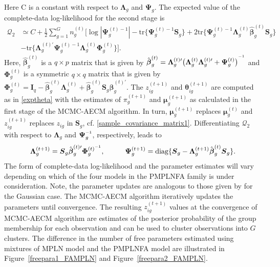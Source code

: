\documentclass[12pt]{article}
\newcommand{\vecI}{\mathbf{I}}
\newcommand{\inv}{^{\raisebox{.2ex}{$\scriptscriptstyle-1$}}}
\begin{document}
Here C is a constant with respect to $\mathbf{\Lambda}_g$ and $\mathbf{\Psi}_g$. The expected value of the complete-data log-likelihood for the second stage is
\begin{equation}
\label{Q2_nonreduced}
\begin{split}
\mathcal{Q}_2 & \simeq C + \frac{1}{2} \sum_{g=1}^G n_g^{(t)} \Bigg[ \log |\boldsymbol{\Psi}_g^{(t) -1}| - \text{tr} \big\{\boldsymbol{\Psi}_g^{(t) -1} \boldsymbol{S}_g\big\} + 2 \text{tr} \big\{\boldsymbol{\Psi}_g^{(t) -1} \boldsymbol{\Lambda}_g^{(t)} \hat{\boldsymbol{\beta}}_g^{(t)} \boldsymbol{S}_g \big\} \\
& - \text{tr}\big\{\boldsymbol{\Lambda}_g^{(t) \prime} \boldsymbol{\Psi}_g^{(t) -1} \boldsymbol{\Lambda}_g^{(t)} \boldsymbol{\Phi}_g^{(t)} \big\} \Bigg].
\end{split}
\end{equation}
Here, $\hat{\boldsymbol{\beta}}_g^{(t)}$ is a $q \times p$ matrix that is given by $\hat{\boldsymbol{\beta}}_g^{(t)} = \boldsymbol{\Lambda}_g^{(t) \prime} \big(\boldsymbol{\Lambda}_g^{(t)} \boldsymbol{\Lambda}_g^{(t) \prime} + \boldsymbol{\Psi}_g^{(t)}\big)^{\inv}$ and $\boldsymbol{\Phi}_g^{(t)}$ is a symmetric $q \times q$ matrix that is given by $\boldsymbol{\Phi}_g^{(t)} = \vecI_q - \hat{\boldsymbol{\beta}}_g^{(t)} \boldsymbol{\Lambda}_g^{(t)} + \hat{\boldsymbol{\beta}}_g^{(t)} \boldsymbol{S}_g \hat{\boldsymbol{\beta}}_g^{(t) \prime}$. The $z_{ig}^{(t+1)}$ and $\boldsymbol{\theta}^{(t+1)}_{ig}$ are computed as in \eqref{exptheta} with the estimates of  $\pi_g^{(t+1)}$ and $\boldsymbol{\mu}_g^{(t+1)}$ as calculated in the first stage of the MCMC-AECM algorithm. In turn, $\boldsymbol{\mu}_g^{(t+1)}$ replaces $\boldsymbol{\mu}_g^{(t)}$ and $z_{ig}^{(t+1)}$ replaces $z_{ig}$ in $\boldsymbol{S}_g$, cf. \eqref{sample_covariance_matrix1}. Differentiating $\mathcal{Q}_2$ with respect to $\boldsymbol{\Lambda}_g$ and $\boldsymbol{\Psi}\inv_g$, respectively, leads to 
\begin{equation*}
\boldsymbol{\Lambda}_g^{(t+1)} = \boldsymbol{S}_g \hat{\boldsymbol{\beta}}^{(t) \prime}
_g{\boldsymbol{\Phi}}_g^{(t) \inv}, \hspace{10mm} \boldsymbol{\Psi}_g^{(t+1)} = \text{diag}\{\boldsymbol{S}_g - \boldsymbol{\Lambda}_g^{(t+1)}\hat{\boldsymbol{\beta}}_g^{(t)} \boldsymbol{S}_g\}.
\end{equation*}
The form of complete-data log-likelihood and the parameter estimates will vary depending on which of the four models in the PMPLNFA family is under consideration. Note, the parameter updates are analogous to those given by \citet{mcnicholas2008} for the Gaussian case. The MCMC-AECM algorithm iteratively updates the parameters until convergence. The resulting $z_{ig}^{(t+1)}$ values at the convergence of MCMC-AECM algorithm are estimates of the posterior probability of the group membership for each observation and can be used to cluster observations into $G$ clusters. The difference in the number of free parameters estimated using mixtures of MPLN model \citep{Silva2017} and the PMPLNFA model are illustrated in Figure~\ref{freepara1_FAMPLN} and Figure~\ref{freepara2_FAMPLN}.
\end{document}
